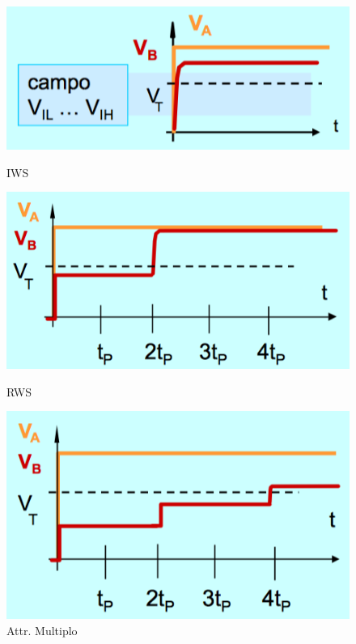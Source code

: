 \documentclass[12pt]{article}
\begin{document}
\begin{figure}[!hp]
  \centering
  \begin{minipage}{.3\textwidth}
    \centering
    \includegraphics[width=\linewidth]{images/iws.png}
    \caption{IWS}
    \label{fig:iws}
  \end{minipage}\hfill
  \begin{minipage}{.3\textwidth}
    \centering
    \includegraphics[width=\linewidth]{images/rws.png}
    \caption{RWS}
    \label{fig:rws}
  \end{minipage}\hfill
  \begin{minipage}{.3\textwidth}
    \centering
    \includegraphics[width=\linewidth]{images/att_mult.png}
    \caption{Attr. Multiplo}
    \label{fig:att_mult}
  \end{minipage}
\end{figure}
\end{document}
